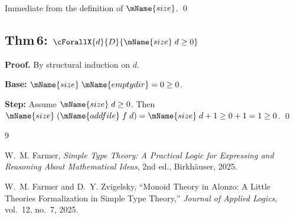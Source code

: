 \documentclass[11pt]{article}
\begin{document}
Immediate from the definition of $\mName{size}$. \qed

\subsection{Thm\,6:
  $\cForallX{d}{D}{\mName{size}\;d \ge 0}$}

\textbf{Proof.}
By structural induction on $d$.

\textbf{Base:} $\mName{size}\;\mName{emptydir} = 0 \ge 0$.

\textbf{Step:} Assume $\mName{size}\;d \ge 0$.  Then
$\mName{size}\;(\mName{addfile}\;f\;d) = \mName{size}\;d + 1
\ge 0 + 1 = 1 \ge 0$. \qed

\begin{thebibliography}{9}

  W.~M. Farmer,
  \emph{Simple Type Theory: A Practical Logic for Expressing and
  Reasoning About Mathematical Ideas},
  2nd ed., Birkh{\"a}user, 2025.

  W.~M. Farmer and D.~Y. Zvigelsky,
  ``Monoid Theory in Alonzo: A Little Theories Formalization in
  Simple Type Theory,''
  \emph{Journal of Applied Logics}, vol.~12, no.~7, 2025.

\end{thebibliography}
\end{document}

